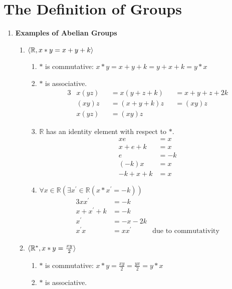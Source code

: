 \chapter{The Definition of Groups}
\label{ch:the-definition-of-groups}

\begin{enumerate}[label={\Alph*.},font={\bfseries}]
\item {\bf Examples of Abelian Groups}
  \begin{enumerate}[label={\arabic*},font={\bfseries}]
  \item $\langle\mathbb{R}, x*y=x+y+k\rangle$
    \begin{enumerate}[label={(\roman*)}]
    \item $*$ is commutative:
      $x*y=x+y+k = y+x+k=y*x$
    \item $*$ is associative.
      \begin{alignat*}{3}
        & x(yz) &&= x(y+z+k) &&= x+y+z+2k \\
        & (xy)z &&= (x+y+k)z &&= (xy)z \\
        & x(yz) &&= (xy)z
      \end{alignat*}
    \item $\mathbb{R}$ has an identity element with respect to $*$.
      \begin{align*}
        xe &= x \\
        x+e+k &= x \\
        e &= -k \\
        (-k)x &= x \\
        -k+x+k &= x
      \end{align*}
    \item $\forall x\in\mathbb{R}(\exists x^\prime\in\mathbb{R}(x*x^\prime=-k))$
      \begin{alignat*}{3}
        xx^\prime &= -k \\
        x+x^\prime+k &= -k \\
        x^\prime &= -x-2k \\
        x^{\prime}x &= xx^\prime & \text{due to commutativity}
      \end{alignat*}
    \end{enumerate}
  \item $\langle\mathbb{R}^*, x*y=\frac{xy}{2}\rangle$
    \begin{enumerate}[label={(\roman*)}]
    \item $*$ is commutative:
      $x*y=\frac{xy}{2} = \frac{yx}{2}=y*x$
    \item $*$ is associative.

\end{enumerate}
\end{enumerate}
\end{enumerate}
